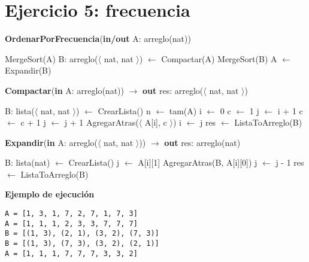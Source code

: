 \section{Ejercicio 5: frecuencia}

\begin{algorithm}[H]
\caption{
    \textbf{OrdenarPorFrecuencia}(\textbf{in/out} A: arreglo(nat))
}
\begin{algorithmic}[1]
    \State MergeSort(A) 
    \State B: arreglo($\langle$ nat, nat $\rangle$) $\gets$ Compactar(A) 
    \State MergeSort(B) 
    \State A $\gets$ Expandir(B) 
\end{algorithmic}
\end{algorithm}

\begin{algorithm}[H]
\caption{
    \textbf{Compactar}(\textbf{in} A: arreglo(nat)) $\to$ \textbf{out} res: arreglo($\langle$ nat, nat $\rangle$)
}
\begin{algorithmic}[1]
    \State B: lista($\langle$ nat, nat $\rangle$) $\gets$ CrearLista() 
    \State n $\gets$ tam(A)
    \State i $\gets$ 0
     
        \State c $\gets$ 1
        \State j $\gets$ i + 1
            \State c $\gets$ c + 1
            \State j $\gets$ j + 1
        \EndWhile
        \State AgregarAtras($\langle$ A[i], c $\rangle$) 
        \State i $\gets$ j
    \EndWhile
    \State res $\gets$ ListaToArreglo(B) 
\end{algorithmic}
\end{algorithm}

\begin{algorithm}[H]
\caption{
    \textbf{Expandir}(\textbf{in} A: arreglo($\langle$ nat, nat $\rangle$)) $\to$ \textbf{out} res: arreglo(nat)
}
\begin{algorithmic}[1]
    \State B: lista(nat) $\gets$ CrearLista() 
     
        \State j $\gets$ A[i][1]
         
            \State AgregarAtras(B, A[i][0]) 
            \State j $\gets$ j - 1
        \EndWhile
    \EndFor
    \State res $\gets$ ListaToArreglo(B) 
\end{algorithmic}
\end{algorithm}

\textbf{Ejemplo de ejecución}

\begin{lstlisting}
A = [1, 3, 1, 7, 2, 7, 1, 7, 3]
A = [1, 1, 1, 2, 3, 3, 7, 7, 7]
B = [(1, 3), (2, 1), (3, 2), (7, 3)]
B = [(1, 3), (7, 3), (3, 2), (2, 1)]
A = [1, 1, 1, 7, 7, 7, 3, 3, 2]
\end{lstlisting}
